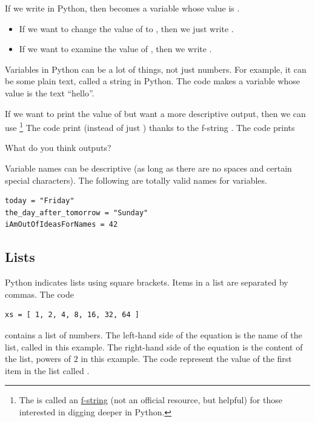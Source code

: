 \documentclass[../book.tex]{subfiles}
\begin{document}
If we write  in Python, then  becomes a variable whose value is .
\begin{itemize}
  \item If we want to change the value of  to , then we just write .
  \item If we want to examine the value of , then we write .
\end{itemize}

Variables in Python can be a lot of things, not just numbers.  For example, it can be some plain text, called a string in Python.  The code  makes a variable whose value is the text ``hello''.

If we want to print the value of  but want a more descriptive output, then we can use \footnote{The  is called an \href{https://stackoverflow.com/questions/57150426/what-is-printf}{f-string} (not an official resource, but helpful) for those interested in digging deeper in Python.}
 The code  print  (instead of just ) thanks to the f-string .  The code  prints 

\begin{exercise} \label{ex:models-2}
What do you think  outputs?
\end{exercise}

Variable names can be descriptive (as long as there are no spaces and certain special characters).  The following are totally valid names for variables.

\begin{verbatim}
today = "Friday"
the_day_after_tomorrow = "Sunday"
iAmOutOfIdeasForNames = 42
\end{verbatim}

\subsection{Lists}

Python indicates lists using square brackets.  Items in a list are separated by commas.  The code
\begin{verbatim}
xs = [ 1, 2, 4, 8, 16, 32, 64 ]
\end{verbatim}
contains a list of numbers.  The left-hand side of the equation is the name of the list, called  in this example.  The right-hand side of the equation is the content of the list, powers of \(2\) in this example.  The code  represent the value of the first item in the list called .
\end{document}
